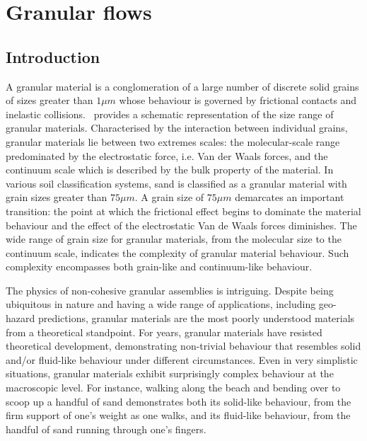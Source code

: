 \chapter{Granular flows}

\ifpdf
    \graphicspath{{Chapter2/figs/raster/}{Chapter2/figs/pdf/}{Chapter2/figs/}}
\else
    \graphicspath{{Chapter2/figs/vector/}{Chapter2/figs/}}
\fi

\section{Introduction}

A granular material is a conglomeration of a large number of discrete solid 
grains of sizes greater than $1\mu m$ whose behaviour is governed by 
frictional contacts and inelastic collisions.~ provides a 
schematic representation of the size range of granular materials. Characterised 
by the interaction between individual grains, granular materials lie between 
two extremes scales: the molecular-scale range predominated by 
the electrostatic force, i.e. Van der Waals forces, and the continuum scale 
which is described by the bulk property of the material. In various soil 
classification systems, sand is classified as a granular material with grain 
sizes greater than $75\mu m$. A grain size of $75\mu m$ demarcates an important 
transition: the point at which the frictional effect begins to dominate the 
material behaviour and the effect of the electrostatic Van de Waals forces 
diminishes. The wide range of grain size for granular materials, from the 
molecular size to the continuum scale, indicates the complexity of granular 
material behaviour. Such complexity encompasses both grain-like and 
continuum-like behaviour.

The physics of non-cohesive granular assemblies is 
intriguing. Despite being ubiquitous in nature and having a wide range of 
applications, including geo-hazard predictions, granular materials are the 
most poorly understood materials from a theoretical standpoint. For years, 
granular materials have resisted theoretical development, demonstrating 
non-trivial behaviour that resembles solid and/or fluid-like behaviour under 
different circumstances. Even in very simplistic situations, granular materials 
exhibit surprisingly complex behaviour at the macroscopic level. For instance, 
walking along the beach and bending over to scoop up a handful of sand 
demonstrates both its solid-like behaviour, from the firm support of one's 
weight as one walks, and its fluid-like behaviour, from the handful of sand 
running through one's fingers.

